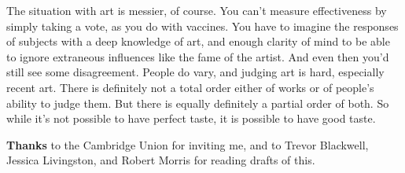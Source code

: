 The situation with art is messier, of course. You can't measure
effectiveness by simply taking a vote, as you do with vaccines. You have
to imagine the responses of subjects with a deep knowledge of art, and
enough clarity of mind to be able to ignore extraneous influences like
the fame of the artist. And even then you'd still see some disagreement.
People do vary, and judging art is hard, especially recent art. There is
definitely not a total order either of works or of people's ability to
judge them. But there is equally definitely a partial order of both. So
while it's not possible to have perfect taste, it is possible to have
good taste.

\textbf{Thanks} to the Cambridge Union for inviting me, and to Trevor
Blackwell, Jessica Livingston, and Robert Morris for reading drafts of
this.
